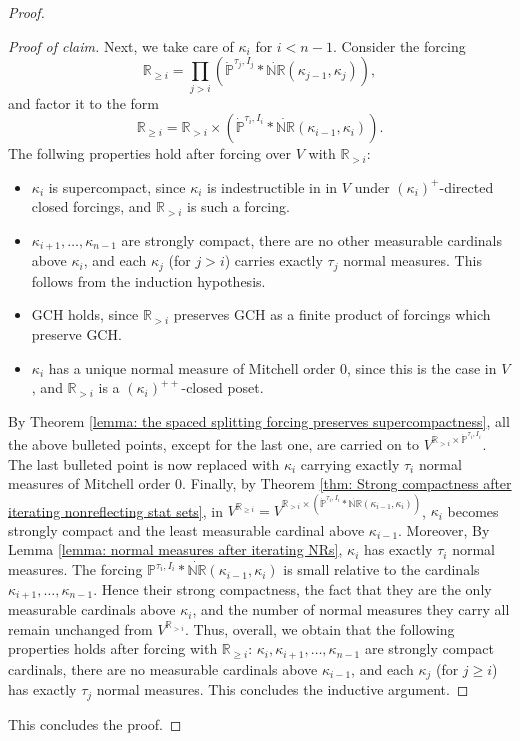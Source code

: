 \documentclass[11pt]{amsart}
\theoremstyle{definition}
\theoremstyle{remark}
\newcommand\<{{<}}
\newcommand{\po}{\mathbb{P}}
\begin{document}
\begin{proof}
\begin{proof}[Proof of claim]
    Next, we take care of $\kappa_i$ for $i<n-1$. Consider the forcing
    $$\mathbb{R}_{\geq i} = \textstyle \prod_{j>i}(\dot{\mathbb{P}}^{\tau_j,I_j}\ast \dot{\mathbb{NR}}{(\kappa_{j-1},\kappa_j)}),$$
    and factor it to the form 
    $$ \mathbb{R}_{\geq i} = \mathbb{R}_{>i} \times \left( \dot{\po}^{\tau_{i}, I_{i}} \ast \dot{\mathbb{NR}}(\kappa_{i-1}, \kappa_{i}) \right). $$
    The follwing properties hold after forcing over $V$ with $\mathbb{R}_{>i}$:
    \begin{itemize}
        \item $\kappa_i$ is supercompact, since $\kappa_i$ is indestructible in  in $V$ under $(\kappa_i)^+$-directed closed forcings, and $\mathbb{R}_{>i}$ is such a forcing.
        \item $\kappa_{i+1}, \ldots, \kappa_{n-1}$ are strongly compact, there are no other measurable cardinals above $\kappa_i$, and each $\kappa_j$ (for $j>i$) carries exactly $\tau_j$ normal measures. This follows from the induction hypothesis.
        \item GCH holds, since $\mathbb{R}_{>i}$ preserves GCH as a finite product of forcings which preserve GCH.
        \item $\kappa_i$ has a unique normal measure of Mitchell order $0$, since this is the case in $V$, and  $\mathbb{R}_{>i}$ is a $(\kappa_{i})^{++}$-closed poset.
    \end{itemize}
    By Theorem \ref{lemma: the spaced splitting forcing preserves supercompactness}, all the above bulleted points, except for the last one, are carried on to $V^{\mathbb{R}_{>i}\times \dot{\po}^{\tau_{i}, I_i}}$. The last bulleted point is now replaced with $\kappa_i$ carrying exactly $\tau_i$ normal measures of Mitchell order $0$. Finally, by Theorem \ref{thm: Strong compactness after iterating nonreflecting stat sets}, in $V^{\mathbb{R}_{\geq i}}=V^{ \mathbb{R}_{>i}\times \left( \dot{\po}^{\tau_{i}, I_i} \ast \dot{\mathbb{NR}}(\kappa_{i-1}, \kappa_i) \right) }$, $\kappa_i$ becomes strongly compact and the least measurable cardinal above $\kappa_{i-1}$. Moreover, By Lemma \ref{lemma: normal measures after iterating NRs}, $\kappa_i$ has exactly $\tau_i$ normal measures. The forcing $\mathbb{P}^{\tau_i, I_i} * \dot{\mathbb{NR}}(\kappa_{i-1}, \kappa_i)$ is small relative to the cardinals $\kappa_{i+1}, \ldots, \kappa_{n-1}$. Hence their strong compactness, the fact that they are the only measurable cardinals above $\kappa_i$, and the number of normal measures they carry all remain unchanged from $V^{\mathbb{R}_{>i}}$. Thus, overall, we obtain that the following properties holds after forcing with $\mathbb{R}_{\geq i}$: $\kappa_i, \kappa_{i+1}, \ldots ,\kappa_{n-1}$ are strongly compact cardinals, there are no measurable cardinals above $\kappa_{i-1}$, and each $\kappa_j$ (for $j\geq i$) has exactly $\tau_j$ normal measures. This concludes the inductive argument.
\end{proof}
This concludes the proof. 
\end{proof}
\end{document}
